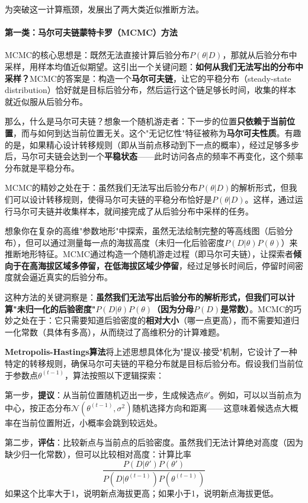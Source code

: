 为突破这一计算瓶颈，发展出了两大类近似推断方法。

\paragraph{第一类：马尔可夫链蒙特卡罗（MCMC）方法}

MCMC的核心思想是：既然无法直接计算后验分布$P(\theta|D)$，那就从后验分布中采样，用样本均值近似期望。这引出一个关键问题：\textbf{如何从我们无法写出的分布中采样？}MCMC的答案是：构造一个\textbf{马尔可夫链}，让它的平稳分布（steady-state distribution）恰好就是目标后验分布，然后运行这个链足够长时间，收集的样本就近似服从后验分布。

那么，什么是马尔可夫链？想象一个随机游走者：下一步的位置\textbf{只依赖于当前位置}，而与如何到达当前位置无关。这个"无记忆性"特征被称为\textbf{马尔可夫性质}。有趣的是，如果精心设计转移规则（即从当前点移动到下一点的概率），经过足够多步后，马尔可夫链会达到一个\textbf{平稳状态}——此时访问各点的频率不再变化，这个频率分布就是平稳分布。

MCMC的精妙之处在于：虽然我们无法写出后验分布$P(\theta|D)$的解析形式，但我们可以设计转移规则，使得马尔可夫链的平稳分布恰好是$P(\theta|D)$。这样，通过运行马尔可夫链并收集样本，就间接完成了从后验分布中采样的任务。

想象你在复杂的高维"参数地形"中探索，虽然无法绘制完整的等高线图（后验分布），但可以通过测量每一点的海拔高度（未归一化后验密度$P(D|\theta)P(\theta)$）来推断地形特征。MCMC通过构造一个随机游走过程（即马尔可夫链），让探索者\textbf{倾向于在高海拔区域多停留，在低海拔区域少停留}，经过足够长时间后，停留时间密度就会逼近真实的后验分布。

这种方法的关键洞察是：\textbf{虽然我们无法写出后验分布的解析形式，但我们可以计算"未归一化的后验密度"$P(D|\theta)P(\theta)$（因为分母$P(D)$是常数）}。MCMC的巧妙之处在于：它只需要知道后验密度的\textbf{相对大小}（哪一点更高），而不需要知道归一化常数（具体有多高），从而绕过了高维积分的计算难题。

\textbf{Metropolis-Hastings算法}将上述思想具体化为"提议-接受"机制，它设计了一种特定的转移规则，确保马尔可夫链的平稳分布就是目标后验分布。假设我们当前位于参数点$\theta^{(t-1)}$，算法按照以下逻辑探索：

第一步，\textbf{提议}：从当前位置随机迈出一步，生成候选点$\theta'$。例如，可以以当前点为中心，按正态分布$\mathcal{N}(\theta^{(t-1)}, \sigma^2)$随机选择方向和距离——这意味着候选点大概率在当前位置附近，小概率会跳到较远处。

第二步，\textbf{评估}：比较新点与当前点的后验密度。虽然我们无法计算绝对高度（因为缺少归一化常数），但可以比较相对高度：计算比率
$$ \frac{P(D|\theta')P(\theta')}{P(D|\theta^{(t-1)})P(\theta^{(t-1)})} $$
如果这个比率大于1，说明新点海拔更高；如果小于1，说明新点海拔更低。

